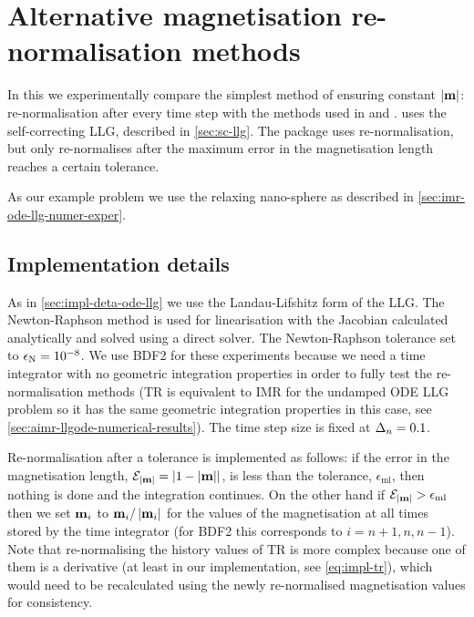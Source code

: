 \newcommand{\mltol}{\epsilon_{\mathrm{ml}}}


\FloatBarrier
\chapter{Alternative magnetisation re-normalisation methods}
\label{sec:magn-renorm-meth}

In this  we experimentally compare the simplest method of ensuring constant $\left|{\boldsymbol{\mathrm{m}}} \right|$: re-normalisation after every time step with the methods used in \nmag and \magpar.
\nmag uses the self-correcting LLG, described in \cref{sec:sc-llg}.
The \magpar package uses re-normalisation, but only re-normalises after the maximum error in the magnetisation length reaches a certain tolerance.

As our example problem we use the relaxing nano-sphere as described in \cref{sec:imr-ode-llg-numer-exper}.


\section{Implementation details}

As in \cref{sec:impl-deta-ode-llg} we use the Landau-Lifshitz form of the LLG.
The Newton-Raphson method is used for linearisation with the Jacobian calculated analytically and solved using a direct solver.
The Newton-Raphson tolerance set to $\epsilon_{\mathrm{N}} = 10^{-8}$.
We use BDF2 for these experiments because we need a time integrator with no geometric integration properties in order to fully test the re-normalisation methods (TR is equivalent to IMR for the undamped ODE LLG problem so it has the same geometric integration properties in this case, see \cref{sec:aimr-llgode-numerical-results}).
The time step size is fixed at $\Delta_{n} = 0.1$.

Re-normalisation after a tolerance is implemented as follows:
if the error in the magnetisation length, $\mathcal{E}_{\left|{\boldsymbol{\mathrm{m}}} \right|} = \left|{1 - \left|{\boldsymbol{\mathrm{m}}} \right|} \right|$, is less than the tolerance, $\mltol$, then nothing is done and the integration continues.
On the other hand if $\errml > \mltol$ then we set $\boldsymbol{\mathrm{m}}_{i}$ to $\boldsymbol{\mathrm{m}}_{i}/\left|{\boldsymbol{\mathrm{m}}_{i}} \right|$ for the values of the magnetisation at all times stored by the time integrator (for BDF2 this corresponds to $i=n+1, n, n-1$).
Note that re-normalising the history values of TR is more complex because one of them is a derivative (at least in our implementation, see \cref{eq:impl-tr}), which would need to be recalculated using the newly re-normalised magnetisation values for consistency.

